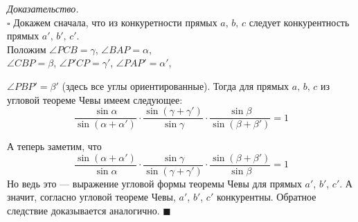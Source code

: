 \documentclass[14pt]{extarticle}
\theoremstyle{definition}
\theoremstyle{theorem}
\renewenvironment{proof}
    {\noindent \textit{Доказательство.}\\
	\indent $\square$}
	{ $\blacksquare$\\ }
\begin{document}

\begin{proof}
Докажем сначала, что из конкуретности прямых \(a, \, b, \, c\)
следует конкурентность прямых \(a', \, b', \, c'\).\\
Положим \(\angle PCB = \gamma\), \( \angle BAP = \alpha\), \\
\(\angle CBP = \beta\), \(\angle P'CP = \gamma'\), \(\angle PAP' = \alpha'\), \par
\begin{figure}
    \vspace{-2cm}
\end{figure}
\noindent\(\angle PBP' = \beta'\) (здесь все углы
ориентированные). Тогда для прямых  \(a, \, b, \, c\) из угловой теореме
Чевы имеем следующее:
\[
\frac{\sin \alpha}{\sin(\alpha + \alpha ')} \cdot
\frac{\sin(\gamma + \gamma ')}{\sin \gamma} \cdot
\frac{\sin \beta}{\sin(\beta + \beta ')} 
 = 1
\]

\noindent А теперь заметим, что 
\[
\frac{\sin(\alpha + \alpha ')}{\sin \alpha} \cdot
\frac{\sin \gamma}{\sin(\gamma + \gamma ')} \cdot
\frac{\sin(\beta + \beta ')}{\sin \beta} 
 = 1
\]
Но ведь это --- выражение угловой формы теоремы Чевы для прямых
\(a'\), \(b'\), \(c'\). А значит, согласно угловой теореме Чевы, 
\(a'\), \(b'\), \(c'\) конкурентны.
Обратное следствие доказывается аналогично. 
\end{proof} \vspace{-4mm} 
\end{document}
